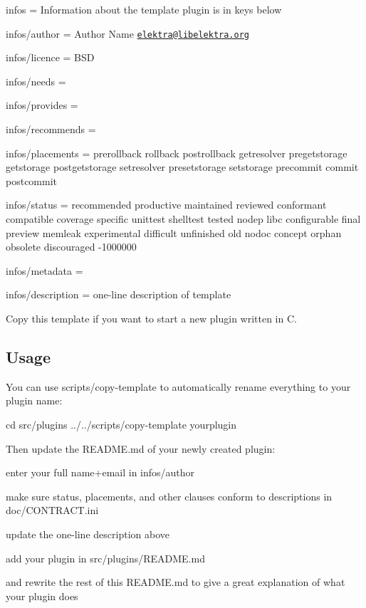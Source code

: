 
\begin{DoxyItemize}
\item infos = Information about the template plugin is in keys below
\item infos/author = Author Name \href{mailto:elektra@libelektra.org}{\tt elektra@libelektra.\+org}
\item infos/licence = B\+SD
\item infos/needs =
\item infos/provides =
\item infos/recommends =
\item infos/placements = prerollback rollback postrollback getresolver pregetstorage getstorage postgetstorage setresolver presetstorage setstorage precommit commit postcommit
\item infos/status = recommended productive maintained reviewed conformant compatible coverage specific unittest shelltest tested nodep libc configurable final preview memleak experimental difficult unfinished old nodoc concept orphan obsolete discouraged -\/1000000
\item infos/metadata =
\item infos/description = one-\/line description of template
\end{DoxyItemize}

Copy this template if you want to start a new plugin written in C.

\subsection*{Usage}

You can use {\ttfamily scripts/copy-\/template} to automatically rename everything to your plugin name\+: \begin{DoxyVerb}    cd src/plugins
    ../../scripts/copy-template yourplugin
\end{DoxyVerb}


Then update the R\+E\+A\+D\+M\+E.\+md of your newly created plugin\+:


\begin{DoxyItemize}
\item enter your full name+email in {\ttfamily infos/author}
\item make sure {\ttfamily status}, {\ttfamily placements}, and other clauses conform to descriptions in {\ttfamily doc/\+C\+O\+N\+T\+R\+A\+C\+T.\+ini}
\item update the one-\/line description above
\item add your plugin in {\ttfamily src/plugins/\+R\+E\+A\+D\+M\+E.\+md}
\item and rewrite the rest of this {\ttfamily R\+E\+A\+D\+M\+E.\+md} to give a great explanation of what your plugin does
\end{DoxyItemize}

